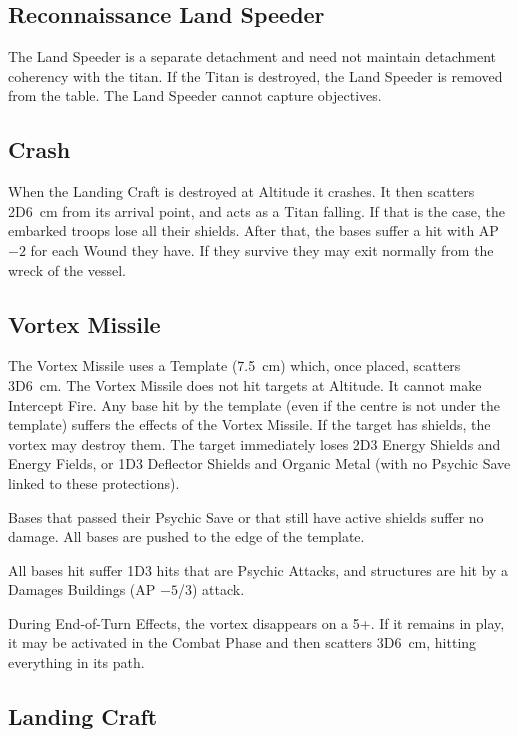 \subsection{Reconnaissance Land Speeder}

The Land Speeder is a separate detachment and need not maintain detachment coherency with the titan. If the Titan is destroyed, the Land Speeder is removed from the table. The Land Speeder cannot capture objectives.

\subsection{Crash}

When the Landing Craft is destroyed at Altitude it crashes. It then scatters 2D6~cm from its arrival point, and acts as a Titan falling. If that is the case, the embarked troops lose all their shields. After that, the bases suffer a hit with AP $-2$ for each Wound they have. If they survive they may exit normally from the wreck of the vessel.

\subsection{Vortex Missile}

The Vortex Missile uses a Template (7.5~cm) which, once placed, scatters 3D6~cm. The Vortex Missile does not hit targets at Altitude. It cannot make Intercept Fire. Any base hit by the template (even if the centre is not under the template) suffers the effects of the Vortex Missile. If the target has shields, the vortex may destroy them. The target immediately loses 2D3 Energy Shields and Energy Fields, or 1D3 Deflector Shields and Organic Metal (with no Psychic Save linked to these protections).

Bases that passed their Psychic Save or that still have active shields suffer no damage. All bases are pushed to the edge of the template.

All bases hit suffer 1D3 hits that are Psychic Attacks, and structures are hit by a Damages Buildings (AP $-5$/3) attack.

During End-of-Turn Effects, the vortex disappears on a 5+. If it remains in play, it may be activated in the Combat Phase and then scatters 3D6~cm, hitting everything in its path.

\subsection{Landing Craft}

